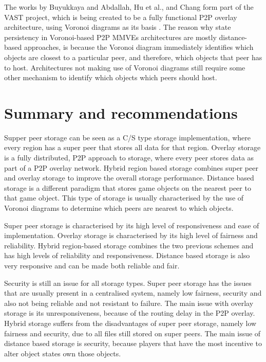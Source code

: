 The works by Buyukkaya and Abdallah, Hu et al., and Chang form part of the VAST project, which is being created to be a fully functional P2P overlay architecture, using Voronoi diagrams as its basis \cite{VAST}. The reason why state persistency in Voronoi-based P2P MMVEs architectures are mostly distance-based approaches, is because the Voronoi diagram immediately identifies which objects are closest to a particular peer, and therefore, which objects that peer has to host. Architectures not making use of Voronoi diagrams still require some other mechanism to identify which objects which peers should host.

\section{Summary and recommendations}
\label{recommendations}

Supper peer storage can be seen as a C/S type storage implementation, where every region has a super peer that stores all data for that region. Overlay storage is a fully distributed, P2P approach to storage, where every peer stores data as part of a P2P overlay network. Hybrid region based storage combines super peer and overlay storage to improve the overall storage performance. Distance based storage is a different paradigm that stores game objects on the nearest peer to that game object. This type of storage is usually characterised by the use of Voronoi diagrams to
determine which peers are nearest to which objects.

Super peer storage is characterised by its high level of responsiveness and ease of implementation. Overlay storage is characterised by its high level of fairness and reliability. Hybrid region-based storage combines the two previous schemes and has high levels of reliability and responsiveness. Distance based storage is also very responsive and can be made both reliable and fair.

Security is still an issue for all storage types. Super peer storage has the issues that are usually present in a centralised system, namely low fairness, security and also not being reliable and not resistant to failure. The main issue with overlay storage is its unresponsiveness, because of the routing delay in the P2P overlay. Hybrid storage suffers from the disadvantages of super peer storage, namely low fairness and security, due to all files still stored on super peers. The main issue of distance based storage is security, because players that have the most incentive to alter object states own those objects.


